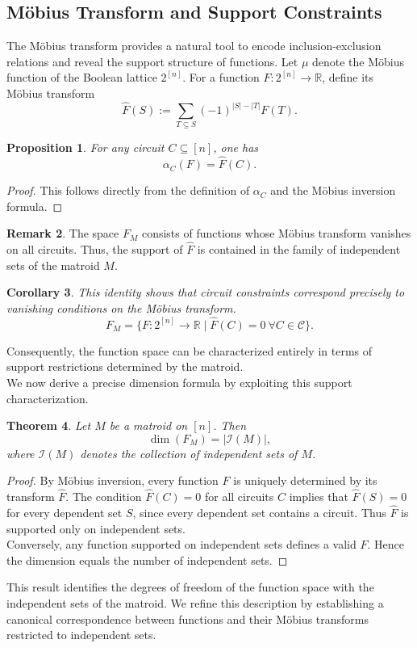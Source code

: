 \documentclass{amsart}
\newtheorem{theorem}{Theorem}[section]
\newtheorem{proposition}[theorem]{Proposition}
\newtheorem{corollary}[theorem]{Corollary}
\theoremstyle{definition}
\newtheorem{remark}[theorem]{Remark}
\begin{document}
\subsection{M\"obius Transform and Support Constraints}
The Möbius transform provides a natural tool to encode inclusion-exclusion relations and reveal the support structure of functions. Let $\mu$ denote the M\"obius function of the Boolean lattice $2^{[n]}$.
For a function $F : 2^{[n]} \to \mathbb{R}$, define its M\"obius transform
\[
\widehat{F}(S) := \sum_{T \subseteq S} (-1)^{|S|-|T|} F(T).
\]

\begin{proposition}\label{prop:mobius}
For any circuit $C \subseteq [n]$, one has
\[
\alpha_C(F) = \widehat{F}(C).
\]
\end{proposition}

\begin{proof}
This follows directly from the definition of $\alpha_C$ and the M\"obius inversion formula.
\end{proof}
\noindent
\begin{remark}
The space $F_M$ consists of functions whose M\"obius transform vanishes on all circuits.
Thus, the support of $\widehat{F}$ is contained in the family of independent sets of the matroid $M$.
\end{remark}
\begin{corollary}\label{cor:mobius} This identity shows that circuit constraints correspond precisely to vanishing conditions on the Möbius transform.
\[
F_M = \{F : 2^{[n]} \to \mathbb{R} \mid \widehat{F}(C) = 0 \ \forall C \in \mathcal{C}\}.
\]
\end{corollary}
\noindent
Consequently, the function space can be characterized entirely in terms of support restrictions determined by the matroid.\\
\noindent
We now derive a precise dimension formula by exploiting this support characterization.
\begin{theorem}
Let $M$ be a matroid on $[n]$. Then
\[
\dim(F_M) = |\mathcal{I}(M)|,
\]
where $\mathcal{I}(M)$ denotes the collection of independent sets of $M$.
\end{theorem}

\begin{proof}
By M\"obius inversion, every function $F$ is uniquely determined by its transform $\widehat{F}$. The condition $\widehat{F}(C)=0$ for all circuits $C$ implies that $\widehat{F}(S)=0$ for every dependent set $S$, since every dependent set contains a circuit. Thus $\widehat{F}$ is supported only on independent sets.\\
\noindent
Conversely, any function supported on independent sets defines a valid $F$. Hence the dimension equals the number of independent sets.
\end{proof}
\noindent
This result identifies the degrees of freedom of the function space with the independent sets of the matroid.
We refine this description by establishing a canonical correspondence between functions and their Möbius transforms restricted to independent sets.
\end{document}
